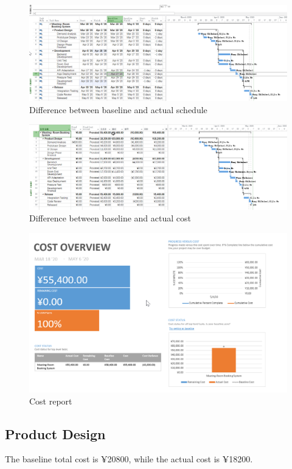 \documentclass[runningheads]{llncs}
\begin{document}
\begin{figure}[H]
  \centering
  \includegraphics[width=1.0\textwidth]{figure/bls1}
  \caption{Difference between baseline and actual schedule}
  \end{figure}

\begin{figure}[H]
  \centering
  \includegraphics[width=1.0\textwidth]{figure/bls2}
  \caption{Difference between baseline and actual cost}
\end{figure}
  
\begin{figure}[H]
  \centering
  \includegraphics[width=1.0\textwidth]{figure/costrp}
  \caption{Cost report}
\end{figure}



\subsection{Product Design}
The baseline total cost is ¥20800, while the actual cost is ¥18200. 
\end{document}
